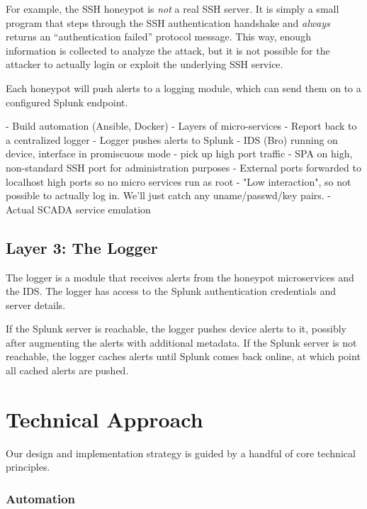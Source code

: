 For example, the SSH honeypot is \textit{not} a real SSH server. It is simply
a small program that steps through the SSH authentication handshake and
\textit{always} returns an ``authentication failed'' protocol message. This
way, enough information is collected to analyze the attack, but it is not
possible for the attacker to actually login or exploit the underlying
SSH service.

Each honeypot will push alerts to a logging module, which
can send them on to a configured Splunk endpoint.

- Build automation (Ansible, Docker)
- Layers of micro-services
- Report back to a centralized logger
- Logger pushes alerts to Splunk
- IDS (Bro) running on device, interface in promiscuous mode
    - pick up high port traffic
- SPA on high, non-standard SSH port for administration purposes
- External ports forwarded to localhost high ports so no micro services
  run as root
- "Low interaction", so not possible to actually log in. We'll just catch
  any uname/passwd/key pairs.
- Actual SCADA service emulation
\subsection{Layer 3: The Logger}

The logger is a module that receives alerts from the honeypot microservices
and the IDS. The logger has access to the Splunk authentication credentials
and server details.

If the Splunk server is reachable, the logger pushes device alerts to it,
possibly after augmenting the alerts with additional metadata. If the Splunk
server is not reachable, the logger caches alerts until Splunk comes back
online, at which point all cached alerts are pushed.

\section{Technical Approach}

Our design and implementation strategy is guided by a handful of core
technical principles.
\subsubsection{Automation}

